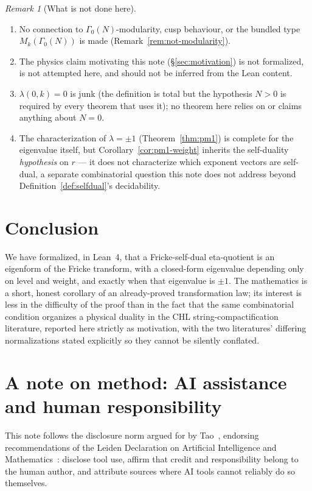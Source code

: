 \documentclass[11pt, a4paper]{article}
\theoremstyle{remark}
\newtheorem{remark}[theorem]{Remark}
\begin{document}
\begin{remark}[What is not done here]
\leavevmode
\begin{enumerate}[label=(\alph*)]
  \item No connection to $\Gamma_0(N)$-modularity, cusp behaviour, or the bundled type
    $M_k(\Gamma_0(N))$ is made (Remark~\ref{rem:not-modularity}).
  \item The physics claim motivating this note (\S\ref{sec:motivation}) is not formalized, is not
    attempted here, and should not be inferred from the Lean content.
  \item $\lambda(0,k)=0$ is junk (the definition is total but the hypothesis $N>0$ is required by
    every theorem that uses it); no theorem here relies on or claims anything about $N=0$.
  \item The characterization of $\lambda=\pm1$ (Theorem~\ref{thm:pm1}) is complete for the
    eigenvalue itself, but Corollary~\ref{cor:pm1-weight} inherits the self-duality
    \emph{hypothesis} on $r$ --- it does not characterize which exponent vectors are self-dual, a
    separate combinatorial question this note does not address beyond
    Definition~\ref{def:selfdual}'s decidability.
\end{enumerate}
\end{remark}

\section{Conclusion}

We have formalized, in Lean~4, that a Fricke-self-dual eta-quotient is an eigenform of the Fricke
transform, with a closed-form eigenvalue depending only on level and weight, and exactly when that
eigenvalue is $\pm1$. The mathematics is a short, honest corollary of an already-proved
transformation law; its interest is less in the difficulty of the proof than in the fact that the
same combinatorial condition organizes a physical duality in the CHL string-compactification
literature, reported here strictly as motivation, with the two literatures' differing
normalizations stated explicitly so they cannot be silently conflated.

\section*{A note on method: AI assistance and human responsibility}

This note follows the disclosure norm argued for by Tao~\cite{Tao2026AI}, endorsing recommendations
of the Leiden Declaration on Artificial Intelligence and Mathematics~\cite{Leiden2026}: disclose
tool use, affirm that credit and responsibility belong to the human author, and attribute sources
where AI tools cannot reliably do so themselves.
\end{document}

